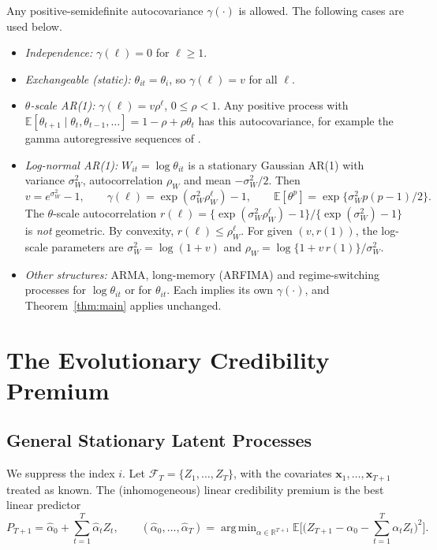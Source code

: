 \documentclass[mathematics,article,submit,moreauthors]{Definitions/mdpi}
\DeclareMathOperator*{\argmin}{arg\,min}
\newcommand{\E}{\mathbb{E}}
\newcommand{\bx}{\boldsymbol{x}}
\begin{document}
Any positive-semidefinite autocovariance $\gamma(\cdot)$ is allowed. The following cases are used below.
\begin{itemize}
\item \emph{Independence:} $\gamma(\ell)=0$ for $\ell\ge1$.
\item \emph{Exchangeable (static):} $\theta_{it}=\theta_i$, so $\gamma(\ell)=v$ for all $\ell$.
\item \emph{$\theta$-scale AR(1):} $\gamma(\ell)=v\rho^\ell$, $0\le\rho<1$. Any positive process with $\E[\theta_{t+1}\mid\theta_t,\theta_{t-1},\ldots]=1-\rho+\rho\theta_t$ has this autocovariance, for example the gamma autoregressive sequences of \citet{gaver1980}.
\item \emph{Log-normal AR(1):} $W_{it}=\log\theta_{it}$ is a stationary Gaussian AR(1) with variance $\sigma_W^2$, autocorrelation $\rho_W$ and mean $-\sigma_W^2/2$. Then
\begin{equation}\label{eq:logar1}
v=e^{\sigma_W^2}-1,\qquad \gamma(\ell)=\exp(\sigma_W^2\rho_W^\ell)-1,\qquad \E[\theta^p]=\exp\{\sigma_W^2p(p-1)/2\}.
\end{equation}
The $\theta$-scale autocorrelation $r(\ell)=\{\exp(\sigma_W^2\rho_W^\ell)-1\}/\{\exp(\sigma_W^2)-1\}$ is \emph{not} geometric. By convexity, $r(\ell)\le\rho_W^\ell$. For given $(v,r(1))$, the log-scale parameters are $\sigma_W^2=\log(1+v)$ and $\rho_W=\log\{1+v\,r(1)\}/\sigma_W^2$.
\item \emph{Other structures:} ARMA, long-memory (ARFIMA) and regime-switching processes for $\log\theta_{it}$ or for $\theta_{it}$. Each implies its own $\gamma(\cdot)$, and Theorem~\ref{thm:main} applies unchanged.
\end{itemize}

\section{The Evolutionary Credibility Premium}\label{sec:premium}

\subsection{General Stationary Latent Processes}

We suppress the index $i$. Let $\mathcal{F}_T=\{Z_1,\dots,Z_T\}$, with the covariates $\bx_1,\dots,\bx_{T+1}$ treated as known. The (inhomogeneous) linear credibility premium is the best linear predictor
\[
P_{T+1}=\widehat{\alpha}_0+\sum_{t=1}^T\widehat{\alpha}_tZ_t,\qquad (\widehat\alpha_0,\dots,\widehat\alpha_T)=\argmin_{\alpha\in\mathbb{R}^{T+1}}\E\Big[\Big(Z_{T+1}-\alpha_0-\sum_{t=1}^T\alpha_tZ_t\Big)^2\Big].
\]
\end{document}
